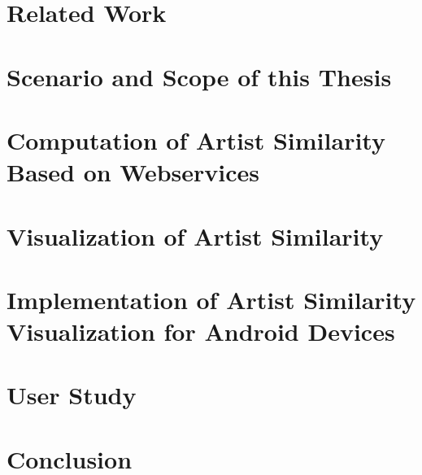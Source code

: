 \documentclass[a4paper,11pt,twoside]{memoir}
\begin{document}


\chapter{Related Work}
\label{ch:relatedwork}



\chapter{Scenario and Scope of this Thesis}
\label{ch:scenario}



\chapter{Computation of Artist Similarity Based on Webservices}
\label{ch:computation}



\chapter{Visualization of Artist Similarity}
\label{ch:visualization}



\chapter{Implementation of Artist Similarity Visualization for Android Devices}
\label{ch:implementation}



\chapter{User Study}
\label{ch:userstudy}



\chapter{Conclusion}
\label{ch:conclusion}




\appendix



\end{document}
